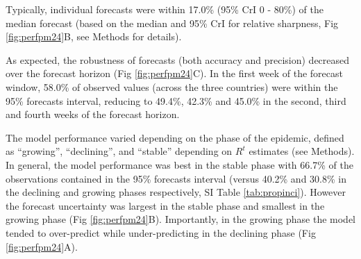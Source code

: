 \documentclass[9pt,twocolumn,twoside,lineno]{pnas-new}
\begin{document}

Typically, individual forecasts were within 17.0\% (95\% CrI 0 - 80\%)
of the median forecast (based on the median and 95\% CrI for
relative sharpness, Fig \ref{fig:perfpm24}B, see Methods for details).

As expected, the robustness of forecasts (both accuracy and precision)
decreased over the forecast
horizon (Fig \ref{fig:perfpm24}C). In the first week of the forecast window, 58.0\% of
observed values (across the three countries) were within the 95\%
forecasts interval, reducing to 49.4\%, 42.3\% and 45.0\% in the
second, third and fourth weeks of the forecast horizon. 




The model performance varied depending on the
phase of the epidemic, defined as ``growing'', ``declining'', and 
``stable'' depending on $R^t$ estimates (see Methods). In
general, the model performance was best in the stable phase with
66.7\% of the observations contained in the 95\% forecasts interval
(versus 40.2\% and 30.8\% in the declining and growing phases respectively,
SI Table \ref{tab:propinci}). However the forecast uncertainty was largest in the stable
phase and smallest in the growing phase (Fig \ref{fig:perfpm24}B).
Importantly, in the growing phase the model tended to over-predict
while under-predicting in the declining phase (Fig \ref{fig:perfpm24}A).
\end{document}
